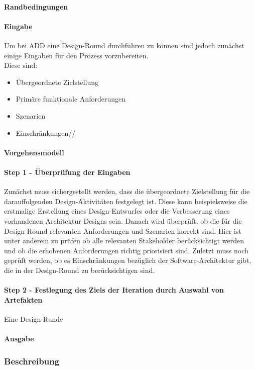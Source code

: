 \paragraph{Randbedingungen}
\paragraph{Eingabe}
Um bei ADD eine Design-Round durchführen zu können sind jedoch zunächst einige Eingaben für den Prozess vorzubereiten.\\

Diese sind:
\begin{itemize}
\item Übergeordnete Zielstellung
\item Primäre funktionale Anforderungen
\item Szenarien
\item Einschränkungen//
\end{itemize}

\paragraph{Vorgehensmodell}

\paragraph{Step 1 - Überprüfung der Eingaben}
Zunächst muss sichergestellt werden, dass die übergeordnete Zielstellung für die darauffolgenden Design-Aktivitäten festgelegt ist. Diese kann beispielsweise die erstmalige Erstellung eines Design-Entwurfes oder die Verbesserung eines vorhandenen Architektur-Designs sein. Danach wird überprüft, ob die für die Design-Round relevanten Anforderungen und Szenarien korrekt sind. Hier ist unter anderem zu prüfen ob alle relevanten Stakeholder berücksichtigt werden und ob die erhobenen Anforderungen richtig priorisiert sind. Zuletzt muss noch geprüft werden, ob es Einschränkungen bezüglich der Software-Architektur gibt, die in der Design-Round zu berücksichtigen sind.\\

\paragraph{Step 2 - Festlegung des Ziels der Iteration durch Auswahl von Artefakten}
Eine Design-Runde 

\paragraph{Ausgabe}

\subsubsection{Beschreibung}